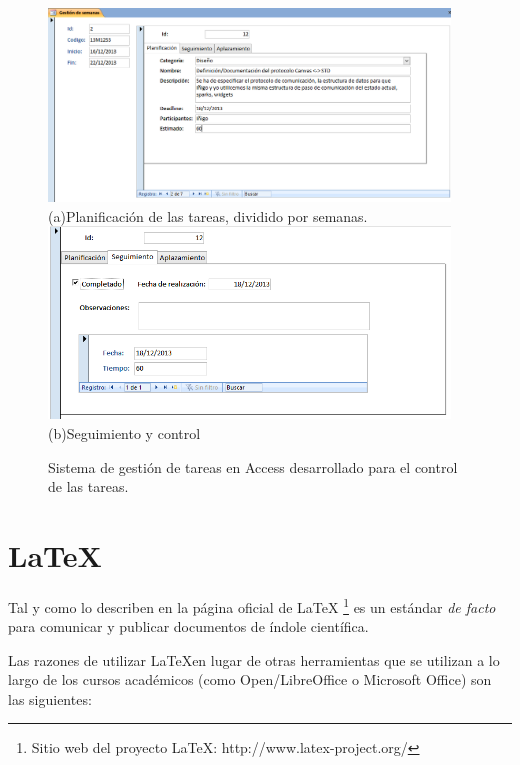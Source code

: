 \begin{figure}
\begin{center}
\includegraphics[width=0.95\textwidth]{figs/6-AccessPlanificacion.png}
(a)Planificación de las tareas, dividido por semanas.
\label{fig:AccessPlanificacion}
\includegraphics[width=0.95\textwidth]{figs/6-AccessSeguimiento.png}
(b)Seguimiento y control
\label{fig:AccessSeguimiento}

\caption{Sistema de gestión de tareas en Access desarrollado para el control de las tareas.}
\label{fig:AccessPlanificacionGestion}
\end{center}
\end{figure}

\section{\LaTeX{}}
\label{sec:Latex}

Tal y como lo describen en la página oficial de \LaTeX{} \footnote{Sitio web del proyecto \LaTeX{}: http://www.latex-project.org/} es un estándar \emph{de facto} para comunicar y publicar documentos de índole científica.

Las razones de utilizar \LaTeX en lugar de otras herramientas que se utilizan a lo largo de los cursos académicos (como Open/LibreOffice o Microsoft Office) son las siguientes:

